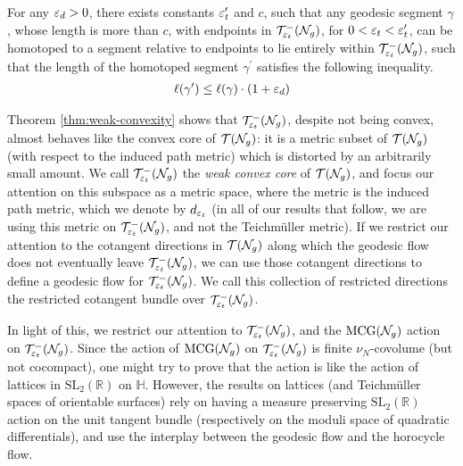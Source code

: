 \begingroup
\def\thetheorem{\ref{thm:weak-convexity}}
\begin{theorem}
  For any $\varepsilon_d > 0$, there exists constants $\varepsilon_t^{\prime}$ and $c$, such that any geodesic segment $\gamma$, whose length is more than $c$, with endpoints in $\mathcal{T}_{\varepsilon_t}^{-}(\mathcal{N}_g)$, for $0 < \varepsilon_t < \varepsilon_t^{\prime}$, can be homotoped to a segment relative to endpoints to lie entirely within $\mathcal{T}_{\varepsilon_t}^{-}(\mathcal{N}_g)$, such that the length of the homotoped segment $\gamma^{\prime}$ satisfies the following inequality.
  \begin{align*}
    \ell(\gamma^{\prime}) \leq \ell(\gamma) \cdot (1 + \varepsilon_d)
  \end{align*}
\end{theorem}
\addtocounter{theorem}{-1}
\endgroup

Theorem \ref{thm:weak-convexity} shows that $\mathcal{T}_{\varepsilon_t}^{-}(\mathcal{N}_g)$, despite not being convex, almost behaves like the convex core of $\mathcal{T}(\mathcal{N}_g)$: it is a metric subset of $\mathcal{T}(\mathcal{N}_g)$ (with respect to the induced path metric) which is distorted by an arbitrarily small amount.
We call $\mathcal{T}_{\varepsilon_t}^{-}(\mathcal{N}_g)$ the \emph{weak convex core} of $\mathcal{T}(\mathcal{N}_g)$, and focus our attention on this subspace as a metric space, where the metric is the induced path metric, which we denote by $d_{\varepsilon_t}$ (in all of our results that follow, we are using this metric on $\mathcal{T}_{\varepsilon_t}^{-}(\mathcal{N}_g)$, and not the Teichmüller metric).
If we restrict our attention to the cotangent directions in $\mathcal{T}(\mathcal{N}_g)$ along which the geodesic flow does not eventually leave $\mathcal{T}_{\varepsilon_t}^{-}(\mathcal{N}_g)$, we can use those cotangent directions to define a geodesic flow for $\mathcal{T}_{\varepsilon_t}^{-}(\mathcal{N}_g)$.
We call this collection of restricted directions the restricted cotangent bundle over $\mathcal{T}_{\varepsilon_t}^{-}(\mathcal{N}_g)$.


In light of this, we restrict our attention to $\mathcal{T}_{\varepsilon_t}^{-}(\mathcal{N}_g)$, and the $\mathrm{MCG}(\mathcal{N}_g)$ action on $\mathcal{T}_{\varepsilon_t}^{-}(\mathcal{N}_g)$.
Since the action of $\mathrm{MCG}(\mathcal{N}_g)$ on $\mathcal{T}_{\varepsilon_t}^{-}(\mathcal{N}_g)$ is finite $\nu_N$-covolume (but not cocompact), one might try to prove that the action is
{like}
the action of lattices in $\mathrm{SL}_2(\mathbb{R})$ on $\mathbb{H}$.
However, the results on lattices (and Teichmüller spaces of orientable surfaces) rely on having a measure preserving $\mathrm{SL}_2(\mathbb{R})$ action on the unit tangent bundle (respectively on the moduli space of quadratic differentials), and use the interplay between the geodesic flow and the horocycle flow.

